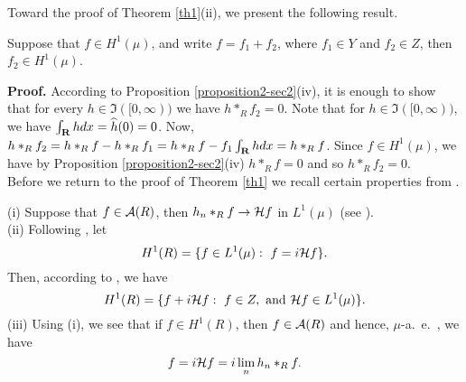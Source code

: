 Toward the proof of 
Theorem \ref{th1}(ii), we present the following result.
\begin{sec4prop3}
Suppose that $f\in H^1(\mu)$,
and write $f=f_1+f_2$, where 
$f_1\in Y$ and $f_2\in Z$, then $f_2\in H^1(\mu)$.
\label{sec4prop3}
\end{sec4prop3}

{\bf Proof.}  According to 
Proposition \ref{proposition2-sec2}(iv),
it is enough to show that for 
every $h\in \Im ([0,\infty))$ we have
$h*_Rf_2=0$.  Note that for $h\in \Im ([0,\infty))$,
we have $\int_\R h dx =\widehat{h}(0)= 0$.
Now, $h*_Rf_2=h*_R f-h*_R f_1=h*_R f- f_1\int_\R h dx =h*_R f$.
Since $f\in H^1(\mu)$, 
we have by Proposition \ref{proposition2-sec2}(iv)
$h*_Rf=0$ and so $h*_Rf_2=0$.\\
Before we return to the proof of Theorem \ref{th1} we 
recall certain properties from \cite{abg2}.
\begin{remark1}
 (i) 
 Suppose that
$f\in {\cal A}(R)$, then $h_n*_Rf\rightarrow {\cal H} f $
in $L^1(\mu)$ (see \cite[Theorem (3.24)]{abg2}).\\
(ii)  Following \cite[Definition (3.29)]{abg2},
let 
$$H^1(R)=\{f\in L^1(\mu):\ f=i{\cal H} f\}.$$
Then, according to \cite[Theorem (3.34)]{abg2},
we have
$$H^1(R)=\{f+i\cH f:\ f\in Z,\ {\rm and}\ 
\cH f\in L^1(\mu)\}.$$
(iii)  Using (i), we see that
if $f\in H^1(R)$, then $f\in {\cal A} (R)$
and hence, $\mu$-a.\ e.\ , we have
$$f=i {\cal H} f = i \lim_n h_n*_R f.$$
\label{remark1}
\end{remark1}

